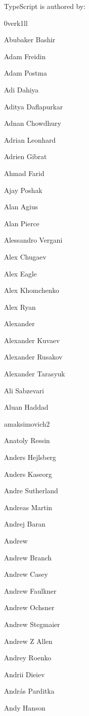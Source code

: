 Type\+Script is authored by\+:


\begin{DoxyItemize}
\item 0verk1ll
\item Abubaker Bashir
\item Adam Freidin
\item Adam Postma
\item Adi Dahiya
\item Aditya Daflapurkar
\item Adnan Chowdhury
\item Adrian Leonhard
\item Adrien Gibrat
\item Ahmad Farid
\item Ajay Poshak
\item Alan Agius
\item Alan Pierce
\item Alessandro Vergani
\item Alex Chugaev
\item Alex Eagle
\item Alex Khomchenko
\item Alex Ryan
\item Alexander
\item Alexander Kuvaev
\item Alexander Rusakov
\item Alexander Tarasyuk
\item Ali Sabzevari
\item Aluan Haddad
\item amaksimovich2
\item Anatoly Ressin
\item Anders Hejlsberg
\item Anders Kaseorg
\item Andre Sutherland
\item Andreas Martin
\item Andrej Baran
\item Andrew
\item Andrew Branch
\item Andrew Casey
\item Andrew Faulkner
\item Andrew Ochsner
\item Andrew Stegmaier
\item Andrew Z Allen
\item Andrey Roenko
\item Andrii Dieiev
\item András Parditka
\item Andy Hanson

\end{DoxyItemize}
